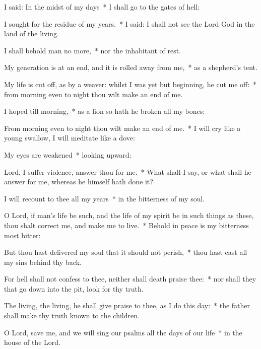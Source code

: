 \begin{enpars}
\item I said: In the midst of my days~* I shall go to the gates of hell:
\item I sought for the residue of my years.~* I said: I shall not see the Lord God in the land of the living.
\item I shall behold man no more,~* nor the inhabitant of rest.
\item My generation is at an end, and it is rolled away from me,~* as a shepherd’s tent.
\item My life is cut off, as by a weaver: whilst I was yet but beginning, he cut me off:~* from morning even to night thou wilt make an end of me.
\item I hoped till morning,~* as a lion so hath he broken all my bones:
\item From morning even to night thou wilt make an end of me.~* I will cry like a young swallow, I will meditate like a dove:
\item My eyes are weakened~* looking upward:
\item Lord, I suffer violence, answer thou for me.~* What shall I say, or what shall he answer for me, whereas he himself hath done it?
\item I will recount to thee all my years~* in the bitterness of my soul.
\item O Lord, if man’s life be such, and the life of my spirit be in such things as these, thou shalt correct me, and make me to live.~* Behold in peace is my bitterness most bitter:
\item But thou hast delivered my soul that it should not perish,~* thou hast cast all my sins behind thy back.
\item For hell shall not confess to thee, neither shall death praise thee:~* nor shall they that go down into the pit, look for thy truth.
\item The living, the living, he shall give praise to thee, as I do this day:~* the father shall make thy truth known to the children.
\item O Lord, save me, and we will sing our psalms all the days of our life~* in the house of the Lord.
\end{enpars}